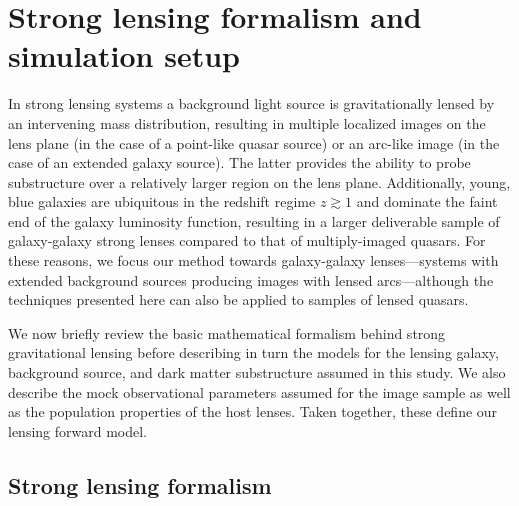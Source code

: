 \documentclass[twocolumn]{aastex63}
\begin{document}
\newpage
\section{Strong lensing formalism and simulation setup}
\label{sec:lensing-formalism}

In strong lensing systems a background light source is gravitationally lensed by an intervening mass distribution, resulting in multiple localized images on the lens plane (in the case of a point-like quasar source) or an arc-like image (in the case of an extended galaxy source). The latter provides the ability to probe substructure over a relatively larger region on the lens plane. Additionally, young, blue galaxies are ubiquitous in the redshift regime $z\gtrsim1$ and dominate the faint end of the galaxy luminosity function, resulting in a larger deliverable sample of galaxy-galaxy strong lenses compared to that of multiply-imaged quasars. For these reasons, we focus our method towards galaxy-galaxy lenses---systems with extended background sources producing images with lensed arcs---although the techniques presented here can also be applied to samples of lensed quasars.

We now briefly review the basic mathematical formalism behind strong gravitational lensing before describing in turn the models for the lensing galaxy, background source, and dark matter substructure assumed in this study. We also describe the mock observational parameters assumed for the image sample as well as the population properties of the host lenses. Taken together, these define our lensing forward model.

\subsection{Strong lensing formalism}
\end{document}

